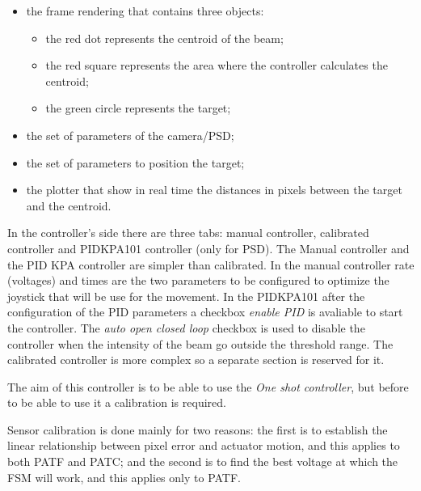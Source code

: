 \begin{itemize}
      \item
            the frame rendering that contains three objects:
            \begin{itemize}

                  \item
                        the red dot represents the centroid of the beam;
                  \item
                        the red square represents the area where the controller calculates the
                        centroid;
                  \item
                        the green circle represents the target;
            \end{itemize}

      \item
            the set of parameters of the camera/PSD;
      \item
            the set of parameters to position the target;
      \item
            the plotter that show in real time the distances in pixels between the
            target and the centroid.
\end{itemize}

In the controller's side there are three tabs: manual controller, calibrated
controller and PIDKPA101 controller (only for PSD).
The Manual controller and the PID KPA controller are simpler than calibrated.
In the manual controller rate (voltages) and times are the two parameters to be configured to optimize the joystick that will be use for the movement.
In the PIDKPA101 after the configuration of the PID parameters a checkbox \emph{enable PID}
is avaliable to start the controller. The \emph{auto open closed loop} checkbox is used to
disable the controller when the intensity of the beam go outside the
threshold range.
The calibrated controller is more complex so a separate section is reserved for it.



The aim of this controller is to be able to use the \emph{One shot controller}, but before to be able to use it a calibration is required.

Sensor calibration is done mainly for two reasons: the first is to establish the linear relationship between pixel error and actuator motion, and this applies to both PATF and PATC; and the second is to find the best voltage at which the FSM will work, and this applies only to PATF.


